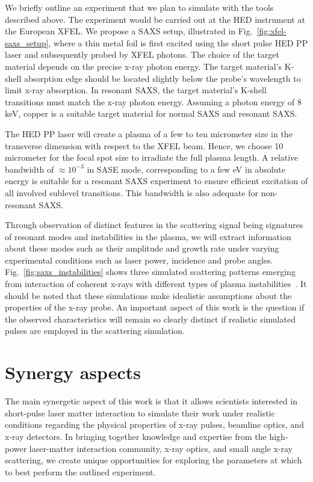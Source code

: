 \documentclass[12pt]{scrartcl}
\begin{document}
We briefly outline an experiment that we plan to simulate with
the tools described above. The experiment would be carried out at the HED
instrument at the European XFEL. We propose a SAXS setup, illustrated in
Fig.~\ref{fig:xfel-saxs_setup}, where a thin metal foil is
first excited using the short pulse HED PP laser and subsequently probed by XFEL
photons.
The choice of the target material depends on the precise x-ray photon energy.
The target material's K-shell absorption edge should be located slightly
below the probe's wavelength to limit x-ray absorption. In resonant
SAXS, the target material's K-shell transitions must match the x-ray photon
energy. Assuming a photon energy of 8 keV, copper is a suitable target material
for normal SAXS and resonant SAXS.

The HED PP laser will
create a plasma of a few to ten micrometer size in the transverse dimension with
respect to the XFEL beam. Hence, we choose 10 micrometer for the focal spot size
to irradiate the full plasma length. A relative bandwidth of
$\approx 10^{-3}$ in SASE mode, corresponding to a few eV in absolute energy is
suitable for a resonant SAXS experiment to ensure efficient excitation of all
involved sublevel transitions. This bandwidth is also adequate for non-resonant SAXS.

Through observation of distinct features in the
scattering signal being signatures of resonant modes and instabilities in the
plasma, we will extract information about these modes such as their amplitude
and growth rate under varying experimental conditions such as laser power,
incidence and probe angles. Fig.~\ref{fig:saxs_instabilities} shows three
simulated scattering patterns emerging from interaction of coherent x-rays with
different types of plasma instabilities~\cite{Kluge2014}.
It should be noted that these simulations make idealistic assumptions about the
properties of the x-ray probe. An important aspect of this work is the question
if the observed characteristics will remain so clearly distinct if realistic
simulated pulses are employed in the scattering simulation.

\section{Synergy aspects}

The main synergetic aspect of this work is that it allows scientists interested
in short-pulse laser matter interaction to simulate their work under realistic
conditions regarding the physical properties of x-ray pulses, beamline optics,
and x-ray detectors.
In bringing together knowledge and expertise from the high-power
laser-matter interaction community, x-ray optics, and small angle x-ray
scattering, we create unique opportunities for exploring the parameters
at which to best perform the outlined experiment.
\end{document}
